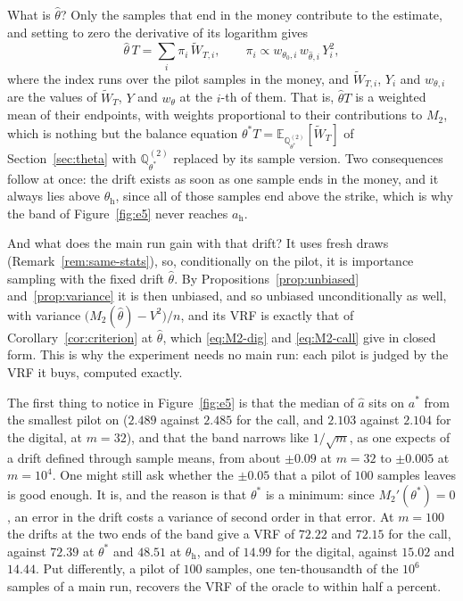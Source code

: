 \documentclass[11pt,a4paper]{article}
\theoremstyle{plain}
\theoremstyle{definition}
\theoremstyle{remark}
\newcommand{\E}{\mathbb{E}}
\newcommand{\Q}{\mathbb{Q}}
\newcommand{\1}{\mathbf{1}}
\newcommand{\Wt}{\widetilde{W}}
\begin{document}
What is $\hat\theta$? Only the samples that end in the money contribute to the estimate, and setting to zero the derivative of its logarithm gives
\begin{equation}\label{eq:pilot-drift}
  \hat\theta\, T = \sum_i \pi_i\, \Wt_{T,i},
  \qquad
  \pi_i \propto w_{\theta_0,i}\, w_{\hat\theta,i}\, Y_i^2,
\end{equation}
where the index runs over the pilot samples in the money, and $\Wt_{T,i}$, $Y_i$ and $w_{\theta,i}$ are the values of $\Wt_T$, $Y$ and $w_\theta$ at the $i$-th of them. That is, $\hat\theta T$ is a weighted mean of their endpoints, with weights proportional to their contributions to $M_2$, which is nothing but the balance equation $\theta^* T = \E_{\Q^{(2)}_{\theta^*}}[\Wt_T]$ of Section~\ref{sec:theta} with $\Q^{(2)}_{\theta^*}$ replaced by its sample version. Two consequences follow at once: the drift exists as soon as one sample ends in the money, and it always lies above $\theta_{\mathrm h}$, since all of those samples end above the strike, which is why the band of Figure~\ref{fig:e5} never reaches $a_{\mathrm h}$.

And what does the main run gain with that drift? It uses fresh draws (Remark~\ref{rem:same-stats}), so, conditionally on the pilot, it is importance sampling with the fixed drift $\hat\theta$. By Propositions~\ref{prop:unbiased} and~\ref{prop:variance} it is then unbiased, and so unbiased unconditionally as well, with variance $\bigl(M_2(\hat\theta) - V^2\bigr)/n$, and its VRF is exactly that of Corollary~\ref{cor:criterion} at $\hat\theta$, which \eqref{eq:M2-dig} and \eqref{eq:M2-call} give in closed form. This is why the experiment needs no main run: each pilot is judged by the VRF it buys, computed exactly.

The first thing to notice in Figure~\ref{fig:e5} is that the median of $\hat a$ sits on $a^*$ from the smallest pilot on ($2.489$ against $2.485$ for the call, and $2.103$ against $2.104$ for the digital, at $m = 32$), and that the band narrows like $1/\sqrt m$, as one expects of a drift defined through sample means, from about $\pm 0.09$ at $m = 32$ to $\pm 0.005$ at $m = 10^4$. One might still ask whether the $\pm 0.05$ that a pilot of $100$ samples leaves is good enough. It is, and the reason is that $\theta^*$ is a minimum: since $M_2'(\theta^*) = 0$, an error in the drift costs a variance of second order in that error. At $m = 100$ the drifts at the two ends of the band give a VRF of $72.22$ and $72.15$ for the call, against $72.39$ at $\theta^*$ and $48.51$ at $\theta_{\mathrm h}$, and of $14.99$ for the digital, against $15.02$ and $14.44$. Put differently, a pilot of $100$ samples, one ten-thousandth of the $10^6$ samples of a main run, recovers the VRF of the oracle to within half a percent.
\end{document}
